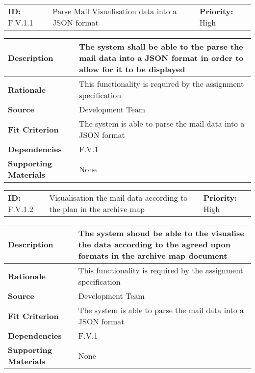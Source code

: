 \begin{table}[H]
    \begin{tabularx}{\textwidth}{| l | X | l |}
        \hline
        \textbf{ID:} F.V.1.1 & Parse Mail Visualisation data into a JSON format & \textbf{Priority:} High \\
    \end{tabularx}
    \begin{tabularx}{\textwidth}{| l | X |}
        \hline
        \textbf{Description} & The system shall be able to the parse the mail data into a JSON format in order to allow for it to be displayed\\ \hline
        \textbf{Rationale} & This functionality is required by the assignment specification\\ \hline
        \textbf{Source} & Development Team\\ \hline
        \textbf{Fit Criterion} & The system is able to parse the mail data into a JSON format\\ \hline
        \textbf{Dependencies} & F.V.1 \\ \hline
        \textbf{Supporting Materials} & None \\ \hline
    \end{tabularx}
\end{table}

\begin{table}[H]
    \begin{tabularx}{\textwidth}{| l | X | l |}
        \hline
        \textbf{ID:} F.V.1.2 & Visualisation the mail data according to the plan in the archive map & \textbf{Priority:} High \\
    \end{tabularx}
    \begin{tabularx}{\textwidth}{| l | X |}
        \hline
        \textbf{Description} & The system shoud be able to the visualise the data according to the agreed upon formats in the archive map document\\ \hline
        \textbf{Rationale} & This functionality is required by the assignment specification\\ \hline
        \textbf{Source} & Development Team\\ \hline
        \textbf{Fit Criterion} & The system is able to parse the mail data into a JSON format\\ \hline
        \textbf{Dependencies} & F.V.1 \\ \hline
        \textbf{Supporting Materials} & None \\ \hline
    \end{tabularx}
\end{table}

